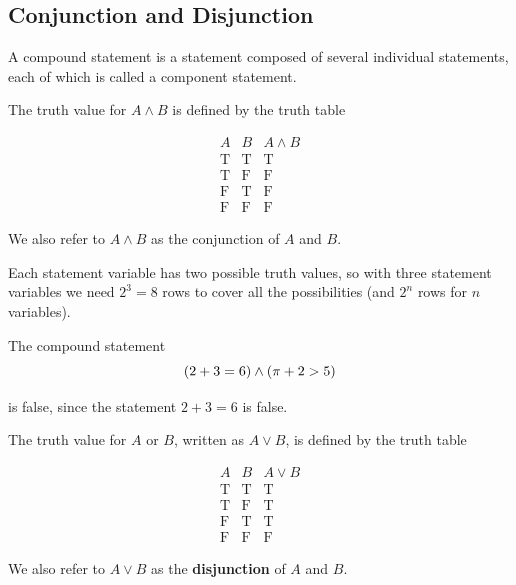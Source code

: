 \subsection{Conjunction and Disjunction}
\begin{definition}
    A compound statement is a statement composed of several individual statements, each of which is called a component statement. 
\end{definition}

\begin{definition}[Conjunction]
    The truth value for $A \wedge B$ is defined by the truth table

    \[
    \begin{array}{c|c|c}
    A & B & A \wedge B \\
    \hline
    \mathrm{T} & \mathrm{T} & \mathrm{T} \\
    \mathrm{T} & \mathrm{F} & \mathrm{F} \\
    \mathrm{F} & \mathrm{T} & \mathrm{F} \\
    \mathrm{F} & \mathrm{F} & \mathrm{F}
    \end{array}
    \]

    We also refer to $A \wedge B$ as the conjunction of $A$ and $B$. 
\end{definition}

Each statement variable has two possible truth values, so with three statement variables we need
$2^3 = 8$ rows to cover all the possibilities (and $2^n$ rows for $n$ variables).

\begin{example}
    The compound statement 
    \begin{equation*}
        \left(2 + 3 = 6\right) \wedge (\pi + 2 > 5)
    \end{equation*}

    is false, since the statement $2 + 3 = 6$ is false. 
\end{example}

\begin{definition}[Disjunction]
    The truth value for $A \text{ or } B$, written as $A \vee B$, is defined by the truth table

    \[
    \begin{array}{c|c|c}
    A & B & A \vee B \\
    \hline
    \mathrm{T} & \mathrm{T} & \mathrm{T} \\
    \mathrm{T} & \mathrm{F} & \mathrm{T} \\
    \mathrm{F} & \mathrm{T} & \mathrm{T} \\
    \mathrm{F} & \mathrm{F} & \mathrm{F}
    \end{array}
    \]

    We also refer to $A \vee B$ as the \textbf{disjunction} of $A$ and $B$. 
\end{definition}

